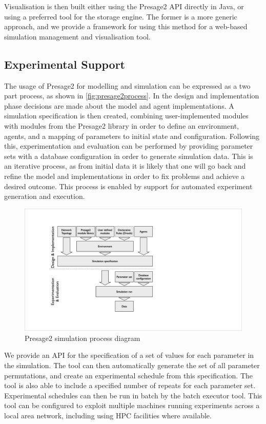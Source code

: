 Visualisation is then built either using the Presage2 \ac{API} directly in Java,
or using a preferred tool for the storage engine. The former is a more generic
approach, and we provide a framework for using this method for a web-based
simulation management and visualisation tool. 

\subsection{Experimental Support}

The usage of Presage2 for modelling and simulation can be expressed as a two
part process, as shown in \autoref{fig:presage2process}. In the design and
implementation phase decisions are made about the model and agent
implementations. A simulation specification is then created, combining 
user-implemented modules with modules from the Presage2 library in order to define
an environment, agents, and a mapping of parameters to initial state and
configuration. Following this, experimentation and evaluation can be performed
by providing parameter sets with a database configuration in order to generate
simulation data. This is an iterative process, as from initial data it is
likely that one will go back and refine the model and implementations in order
to fix problems and achieve a desired outcome. This process is enabled by
support for automated experiment generation and execution.

\begin{figure}
\centering
\caption{Presage2 simulation process diagram}\label{fig:presage2process}
\includegraphics[width=0.8\linewidth]{gfx/presage2/simulation_process}
\end{figure}

We provide an \ac{API} for the specification of a set of values for each
parameter in the simulation. The tool can then automatically generate the set
of all parameter permutations, and create an experimental schedule from this
specification. The tool is also able to include a specified number of repeats
for each parameter set. Experimental schedules can then be run in batch by the
batch executor tool. This tool can be configured to exploit multiple machines
running experiments across a local area network, including using \ac{HPC}
facilities where available.

